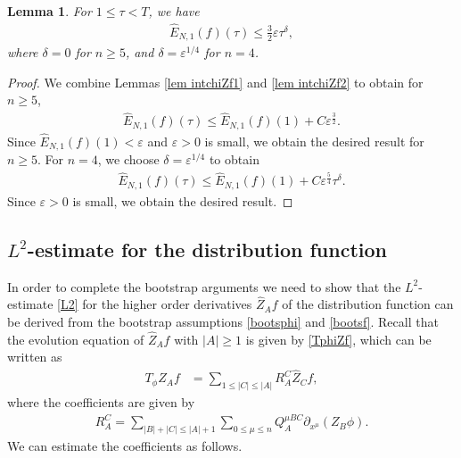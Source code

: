 \documentclass{article}
\newtheorem{lemma}{Lemma}[section]
\begin{document}
%
\begin{lemma} \label{lem improvef}
For $ 1 \leq \tau < T $, we have 
\begin{align}
\hat{ E }_{ N , 1 } ( f ) ( \tau ) \leq \frac{ 3 }{ 2 } \varepsilon \tau^\delta , \label{improvef}
\end{align}
where $ \delta = 0 $ for $ n \geq 5 $, and $ \delta = \varepsilon^{ 1 / 4 } $ for $ n = 4 $. 
\end{lemma}
%
\begin{proof}
We combine Lemmas \ref{lem intchiZf1} and \ref{lem intchiZf2} to obtain for $ n \geq 5 $,
\begin{align*}
\hat{ E }_{ N , 1 } ( f ) ( \tau ) \leq \hat{ E }_{ N , 1 } ( f ) ( 1 ) + C \varepsilon^{ \frac32 } .
\end{align*}
Since $ \hat{ E }_{ N , 1 } ( f ) ( 1 ) < \varepsilon $ and $ \varepsilon > 0 $ is small, we obtain the desired result for $ n \geq 5 $. For $ n = 4 $, we choose $ \delta = \varepsilon^{ 1 / 4 } $ to obtain
\begin{align*}
\hat{ E }_{ N , 1 } ( f ) ( \tau ) \leq \hat{ E }_{ N , 1 } ( f ) ( 1 ) + C \varepsilon^{ \frac54 } \tau^\delta .
\end{align*}
Since $ \varepsilon > 0 $ is small, we obtain the desired result.
\end{proof}




%
\subsection{$ L^2 $-estimate for the distribution function} \label{sec L2}
In order to complete the bootstrap arguments we need to show that the $ L^2 $-estimate \eqref{L2} for the higher order derivatives $ \hat{ Z }_A f $ of the distribution function can be derived from the bootstrap assumptions \eqref{bootsphi} and \eqref{bootsf}. Recall that the evolution equation of $ \hat{ Z }_A f $ with $ | A | \geq 1 $ is given by \eqref{TphiZf}, which can be written as
\begin{align}
T_\phi \hat{ Z }_A f & = \sum_{ 1 \leq | C | \leq | A | } R^C_A \hat{ Z }_C f , \label{TphiZf'}
\end{align}
where the coefficients are given by
\begin{align}
R^C_A = \sum_{ | B | + | C | \leq | A | + 1 } \sum_{ 0 \leq \mu \leq n } Q^{ \mu B C }_{ A } \partial_{ x^\mu } ( Z_B \phi ) . \label{coefficient}
\end{align}
We can estimate the coefficients as follows.
\end{document}
